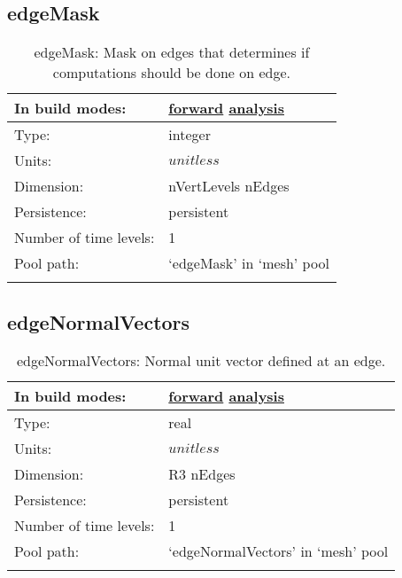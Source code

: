 \subsection[edgeMask]{edgeMask}
\label{subsec:var_sec_mesh_edgeMask}
\begin{center}
\begin{longtable}{| p{2.0in} | p{4.0in} |}
        \hline 
        In build modes: & \hyperref[subsec:forward_var_tab_mesh]{forward} \hyperref[subsec:analysis_var_tab_mesh]{analysis} \\
        \hline 
        Type: & integer \\
        \hline 
        Units: & $unitless$ \\
        \hline 
        Dimension: & nVertLevels nEdges \\
        \hline 
        Persistence: & persistent \\
        \hline 
        Number of time levels: & 1 \\
        \hline 
            Pool path: & `edgeMask' in `mesh' pool \\
		 \hline 
    \caption{edgeMask: Mask on edges that determines if computations should be done on edge.}
\end{longtable}
\end{center}
\subsection[edgeNormalVectors]{edgeNormalVectors}
\label{subsec:var_sec_mesh_edgeNormalVectors}
\begin{center}
\begin{longtable}{| p{2.0in} | p{4.0in} |}
        \hline 
        In build modes: & \hyperref[subsec:forward_var_tab_mesh]{forward} \hyperref[subsec:analysis_var_tab_mesh]{analysis} \\
        \hline 
        Type: & real \\
        \hline 
        Units: & $unitless$ \\
        \hline 
        Dimension: & R3 nEdges \\
        \hline 
        Persistence: & persistent \\
        \hline 
        Number of time levels: & 1 \\
        \hline 
            Pool path: & `edgeNormalVectors' in `mesh' pool \\
		 \hline 
    \caption{edgeNormalVectors: Normal unit vector defined at an edge.}
\end{longtable}
\end{center}
